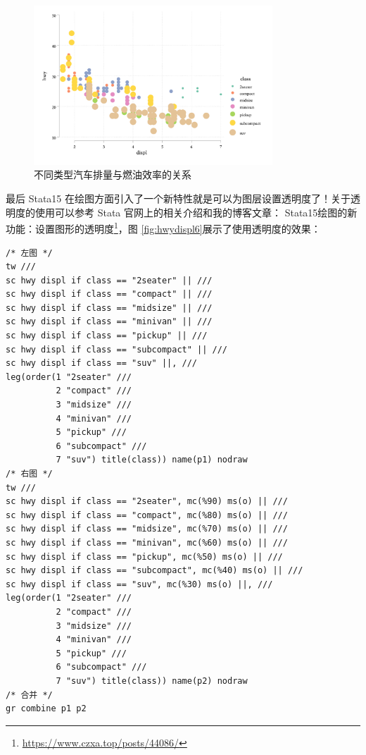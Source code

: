 \documentclass[]{ctexbook}
\renewcommand{\href}[2]{#2\footnote{\url{#1}}}
\begin{document}
\begin{figure}

{\centering \includegraphics[width=0.8\textwidth]{assets/hwydispl5} 

}

\caption{不同类型汽车排量与燃油效率的关系}\label{fig:hwydispl5}
\end{figure}

最后 Stata15 在绘图方面引入了一个新特性就是可以为图层设置透明度了！关于透明度的使用可以参考 Stata 官网上的相关介绍和我的博客文章： \href{https://www.czxa.top/posts/44086/}{Stata15绘图的新功能：设置图形的透明度}，图 \ref{fig:hwydispl6}展示了使用透明度的效果：

\begin{lstlisting}
/* 左图 */
tw ///
sc hwy displ if class == "2seater" || ///
sc hwy displ if class == "compact" || ///
sc hwy displ if class == "midsize" || ///
sc hwy displ if class == "minivan" || ///
sc hwy displ if class == "pickup" || ///
sc hwy displ if class == "subcompact" || ///
sc hwy displ if class == "suv" ||, ///
leg(order(1 "2seater" ///
          2 "compact" ///
          3 "midsize" ///
          4 "minivan" ///
          5 "pickup" ///
          6 "subcompact" ///
          7 "suv") title(class)) name(p1) nodraw
/* 右图 */
tw ///
sc hwy displ if class == "2seater", mc(%90) ms(o) || ///
sc hwy displ if class == "compact", mc(%80) ms(o) || ///
sc hwy displ if class == "midsize", mc(%70) ms(o) || ///
sc hwy displ if class == "minivan", mc(%60) ms(o) || ///
sc hwy displ if class == "pickup", mc(%50) ms(o) || ///
sc hwy displ if class == "subcompact", mc(%40) ms(o) || ///
sc hwy displ if class == "suv", mc(%30) ms(o) ||, ///
leg(order(1 "2seater" ///
          2 "compact" ///
          3 "midsize" ///
          4 "minivan" ///
          5 "pickup" ///
          6 "subcompact" ///
          7 "suv") title(class)) name(p2) nodraw
/* 合并 */
gr combine p1 p2
\end{lstlisting}
\end{document}
